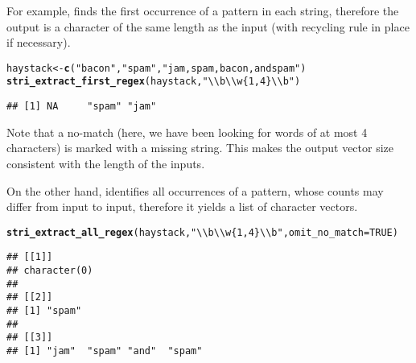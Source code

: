 \documentclass[nojss]{jss}\usepackage[]{graphicx}\usepackage[]{xcolor}
\makeatletter
\newcommand{\hlnum}[1]{\textcolor[rgb]{0.686,0.059,0.569}{#1}}%
\newcommand{\hlstr}[1]{\textcolor[rgb]{0.192,0.494,0.8}{#1}}%
\newcommand{\hlstd}[1]{\textcolor[rgb]{0.345,0.345,0.345}{#1}}%
\newcommand{\hlkwb}[1]{\textcolor[rgb]{0.69,0.353,0.396}{#1}}%
\newcommand{\hlkwc}[1]{\textcolor[rgb]{0.333,0.667,0.333}{#1}}%
\newcommand{\hlkwd}[1]{\textcolor[rgb]{0.737,0.353,0.396}{\textbf{#1}}}%
\newenvironment{kframe}{%
 \def\at@end@of@kframe{}%
 \ifinner\ifhmode%
  \def\at@end@of@kframe{\end{minipage}}%
  \begin{minipage}{\columnwidth}%
 \fi\fi%
 \def\FrameCommand##1{\hskip\@totalleftmargin \hskip-\fboxsep
 \colorbox{shadecolor}{##1}\hskip-\fboxsep
     \hskip-\linewidth \hskip-\@totalleftmargin \hskip\columnwidth}%
 \MakeFramed {\advance\hsize-\width
   \@totalleftmargin\z@ \linewidth\hsize
   \@setminipage}}%
 {\par\unskip\endMakeFramed%
 \at@end@of@kframe}
\newenvironment{knitrout}{}{} %
\makeatother
\begin{document}
For example, 
finds the first occurrence of a pattern in each string,
therefore the output is a character of the same length
as the input (with recycling rule in place if necessary).








\begin{knitrout}
\color{fgcolor}\begin{kframe}
\begin{alltt}
\hlstd{haystack} \hlkwb{<-} \hlkwd{c}\hlstd{(}\hlstr{"bacon"}\hlstd{,} \hlstr{"spam"}\hlstd{,} \hlstr{"jam, spam, bacon, and spam"}\hlstd{)}
\hlkwd{stri_extract_first_regex}\hlstd{(haystack,} \hlstr{"\textbackslash{}\textbackslash{}b\textbackslash{}\textbackslash{}w\{1,4\}\textbackslash{}\textbackslash{}b"}\hlstd{)}
\end{alltt}
\begin{verbatim}
## [1] NA     "spam" "jam"
\end{verbatim}
\end{kframe}
\end{knitrout}

Note that a no-match (here, we have been looking for words
of at most 4 characters)
is marked with a missing string.
This makes the output vector size consistent with the length of
the inputs.

On the other hand, 
identifies all occurrences of a pattern, whose counts may differ from input to input,
therefore it yields a list of character vectors.

\begin{knitrout}
\color{fgcolor}\begin{kframe}
\begin{alltt}
\hlkwd{stri_extract_all_regex}\hlstd{(haystack,} \hlstr{"\textbackslash{}\textbackslash{}b\textbackslash{}\textbackslash{}w\{1,4\}\textbackslash{}\textbackslash{}b"}\hlstd{,} \hlkwc{omit_no_match}\hlstd{=}\hlnum{TRUE}\hlstd{)}
\end{alltt}
\begin{verbatim}
## [[1]]
## character(0)
## 
## [[2]]
## [1] "spam"
## 
## [[3]]
## [1] "jam"  "spam" "and"  "spam"
\end{verbatim}
\end{kframe}
\end{knitrout}
\end{document}
